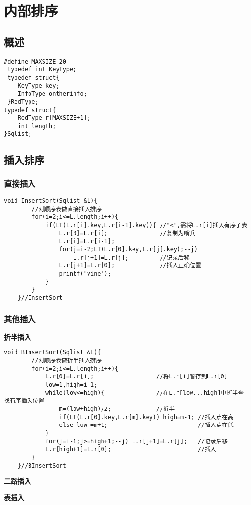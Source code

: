 \documentclass[UTF8]{ctexart}
\newcommand{\mb}[1]{\textbf{#1}}
\newcommand{\p}{\par}
\begin{document}
\newpage
\section{内部排序}


\subsection{概述}

\begin{lstlisting}[style=v1]
 #define MAXSIZE 20
 typedef int KeyType;
 typedef struct{
    KeyType key;
    InfoType ontherinfo;
 }RedType;
typedef struct{
    RedType r[MAXSIZE+1];
    int length;
}Sqlist;
\end{lstlisting}


\subsection{插入排序}
\subsubsection{直接插入}

\begin{lstlisting}[style=v1]
    void InsertSort(Sqlist &L){
        //对顺序表做直接插入排序
        for(i=2;i<=L.length;i++){
            if(LT(L.r[i].key,L.r[i-1].key)){ //"<",需将L.r[i]插入有序子表
                L.r[0]=L.r[i];               //复制为哨兵
                L.r[i]=L.r[i-1];
                for(j=i-2;LT(L.r[0].key,L.r[j].key);--j)
                    L.r[j+1]=L.r[j];         //记录后移  
                L.r[j+1]=L.r[0];             //插入正确位置
                printf("vine");
            }
        }
    }//InsertSort
\end{lstlisting}

\subsubsection{其他插入}

\mb{折半插入}
\begin{lstlisting}[style=v1]
    void BInsertSort(Sqlist &L){
        //对顺序表做折半插入排序
        for(i=2;i<=L.length;i++){
            L.r[0]=L.r[i];                  //将L.r[i]暂存到L.r[0]
            low=1,high=i-1;
            while(low<=high){               //在L.r[low...high]中折半查找有序插入位置
                m=(low+high)/2;             //折半
                if(LT(L.r[0].key,L.r[m].key)) high=m-1; //插入点在高
                else low =m+1;                          //插入点在低   
            }
            for(j=i-1;j>=high+1;--j) L.r[j+1]=L.r[j];   //记录后移
            L.r[high+1]=L.r[0];                         //插入
        }
    }//BInsertSort
\end{lstlisting}\p
\mb{二路插入}\p
\mb{表插入}\p
\end{document}
